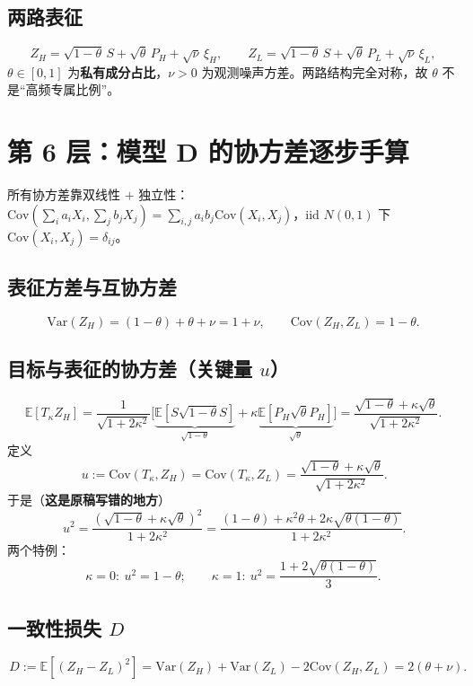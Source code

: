 \documentclass[UTF8,11pt,a4paper]{ctexart}
\newcommand{\E}{\mathbb{E}}
\newcommand{\Var}{\mathrm{Var}}
\newcommand{\Cov}{\mathrm{Cov}}
\begin{document}
\subsection{两路表征}
\[
Z_H=\sqrt{1-\theta}\,S+\sqrt\theta\,P_H+\sqrt\nu\,\xi_H,\qquad
Z_L=\sqrt{1-\theta}\,S+\sqrt\theta\,P_L+\sqrt\nu\,\xi_L ,
\]
$\theta\in[0,1]$ 为\textbf{私有成分占比}，$\nu>0$ 为观测噪声方差。两路结构完全对称，故 $\theta$ 不是``高频专属比例''。

\section{第 6 层：模型 D 的协方差逐步手算}

所有协方差靠双线性 $+$ 独立性：
$\Cov(\sum_i a_iX_i,\sum_j b_jX_j)=\sum_{i,j}a_ib_j\Cov(X_i,X_j)$，iid $N(0,1)$ 下 $\Cov(X_i,X_j)=\delta_{ij}$。

\subsection{表征方差与互协方差}
\[
\Var(Z_H)=(1-\theta)+\theta+\nu=1+\nu,\qquad
\Cov(Z_H,Z_L)=1-\theta .
\]

\subsection{目标与表征的协方差（关键量 $u$）}
\[
\E[T_\kappa Z_H]=\frac{1}{\sqrt{1+2\kappa^2}}\Big[\underbrace{\E[S\sqrt{1-\theta}S]}_{\sqrt{1-\theta}}+\kappa\underbrace{\E[P_H\sqrt\theta P_H]}_{\sqrt\theta}\Big]
=\frac{\sqrt{1-\theta}+\kappa\sqrt\theta}{\sqrt{1+2\kappa^2}} .
\]
定义
\begin{equation}
\boxed{\,u:=\Cov(T_\kappa,Z_H)=\Cov(T_\kappa,Z_L)=\frac{\sqrt{1-\theta}+\kappa\sqrt\theta}{\sqrt{1+2\kappa^2}}.}
\end{equation}
于是（\textbf{这是原稿写错的地方}）
\begin{equation}
\boxed{\,u^2=\frac{(\sqrt{1-\theta}+\kappa\sqrt\theta)^2}{1+2\kappa^2}
=\frac{(1-\theta)+\kappa^2\theta+2\kappa\sqrt{\theta(1-\theta)}}{1+2\kappa^2}.} \label{eq:u2}
\end{equation}
两个特例：
\begin{equation}
\kappa=0:\ u^2=1-\theta;\qquad \kappa=1:\ u^2=\frac{1+2\sqrt{\theta(1-\theta)}}{3}. \label{eq:u2spec}
\end{equation}

\subsection{一致性损失 $D$}
\begin{equation}
\boxed{\,D:=\E[(Z_H-Z_L)^2]=\Var(Z_H)+\Var(Z_L)-2\Cov(Z_H,Z_L)=2(\theta+\nu).\,} \label{eq:D}
\end{equation}
\end{document}
